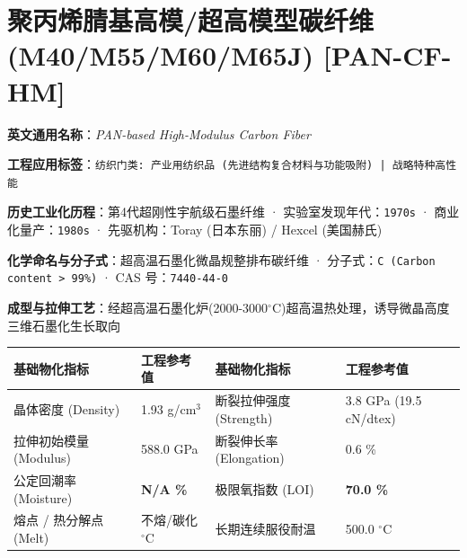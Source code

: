 \documentclass[11pt,openright,twoside,UTF8]{ctexbook}
\begin{document}
\section{聚丙烯腈基高模/超高模型碳纤维 (M40/M55/M60/M65J) [PAN-CF-HM]}
\label{sec:pan-cf-hm}

\noindent\textbf{英文通用名称}：\textit{PAN-based High-Modulus Carbon Fiber}\par
\noindent\textbf{工程应用标签}：\texttt{纺织门类: 产业用纺织品 (先进结构复合材料与功能吸附) | 战略特种高性能}\par
\noindent\textbf{历史工业化历程}：第4代超刚性宇航级石墨纤维 · 实验室发现年代：\texttt{1970s} · 商业化量产：\texttt{1980s} · 先驱机构：Toray (日本东丽) / Hexcel (美国赫氏)\par
\noindent\textbf{化学命名与分子式}：超高温石墨化微晶规整排布碳纤维 · 分子式：\texttt{C (Carbon content \textgreater{} 99\%)} · CAS 号：\texttt{7440-44-0}\par
\noindent\textbf{成型与拉伸工艺}：经超高温石墨化炉(2000-3000$^\circ\mathrm{C}$)超高温热处理，诱导微晶高度三维石墨化生长取向\par

\vspace{0.15cm}
\begin{center}
\small
\begin{tabularx}{\textwidth}{p{3.8cm}Xp{3.8cm}X}
\toprule
\textbf{基础物化指标} & \textbf{工程参考值} & \textbf{基础物化指标} & \textbf{工程参考值} \\
\midrule
晶体密度 (Density) & 1.93 g/cm$^3$ & 断裂拉伸强度 (Strength) & 3.8 GPa (19.5 cN/dtex) \\
拉伸初始模量 (Modulus) & 588.0 GPa & 断裂伸长率 (Elongation) & 0.6 \% \\
公定回潮率 (Moisture) & \textbf{N/A \%} & 极限氧指数 (LOI) & \textbf{70.0 \%} \\
熔点 / 热分解点 (Melt) & 不熔/碳化 $^\circ\mathrm{C}$ & 长期连续服役耐温 & 500.0 $^\circ\mathrm{C}$ \\
\bottomrule
\end{tabularx}
\end{center}
\vspace{0.15cm}
\end{document}
